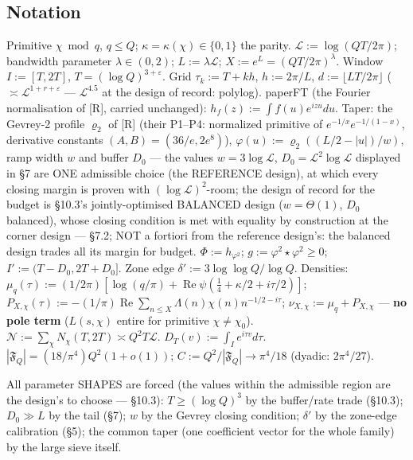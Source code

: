 \documentclass[11pt]{amsart}
\newcommand{\re}{\operatorname{Re}}
\theoremstyle{plain}
\theoremstyle{remark}
\begin{document}
\subsection{Notation}

Primitive $\chi \bmod q$, $q \le Q$; $\kappa = \kappa(\chi) \in \{0, 1\}$ the parity.
$\mathcal{L} := \log(QT/2\pi)$; bandwidth parameter $\lambda \in (0, 2)$;
$L := \lambda\mathcal{L}$; $X := e^L = (QT/2\pi)^\lambda$. Window $I := [T, 2T]$,
$T = (\log Q)^{3+\varepsilon}$. Grid $\tau_k := T + kh$, $h := 2\pi/L$,
$d := \lfloor LT/2\pi\rfloor$ ($\asymp \mathcal{L}^{1+r+\varepsilon}$ ---
$\mathcal{L}^{4.5}$ at the design of record: polylog). paperFT (the Fourier normalisation of [R],
carried unchanged):
$h_f(z) := \int f(u)e^{izu}du$. Taper: the Gevrey-2 profile $\varrho_2$ of [R] (their
P1--P4: normalized primitive of $e^{-1/x}e^{-1/(1-x)}$, derivative constants
$(A, B) = (36/e, 2e^{8})$), $\varphi(u) := \varrho_2((L/2 - |u|)/w)$, ramp width $w$
and buffer $D_0$ --- the values $w = 3 \log \mathcal{L}$,
$D_0 = \mathcal{L}^2 \log \mathcal{L}$ displayed in \S7 are ONE admissible choice (the
REFERENCE design), at which every closing margin is proven with
$(\log \mathcal{L})^2$-room; the design of record for the budget is \S10.3's
jointly-optimised BALANCED design ($w = \Theta(1)$, $D_0$ balanced), whose closing
condition is met with equality by construction at the corner design --- \S7.2; NOT a
fortiori from the reference design's: the balanced design trades all its margin for
budget. $\Phi := h_{\varphi^2}$; $g := \varphi^2\star\varphi^2 \ge 0$;
$I' := (T - D_0, 2T + D_0]$. Zone edge
{\boldmath$\delta' := 3 \log \log Q/\log Q$}. Densities:
$\mu_q(\tau) := (1/2\pi)[\log(q/\pi) + \re \psi(\tfrac{1}{4} + \kappa/2 + i\tau/2)]$;
$P_{X,\chi}(\tau) := -(1/\pi) \re \sum_{n\le X} \Lambda(n)\chi(n)n^{-1/2-i\tau}$;
$\nu_{X,\chi} := \mu_q + P_{X,\chi}$ --- \textbf{no pole term} ($L(s,\chi)$ entire for
primitive $\chi \ne \chi_0$). $\mathcal{N} := \sum_\chi N_\chi(T, 2T) \asymp
Q^2T\mathcal{L}$. $D_T(v) := \int_I e^{i\tau v}d\tau$.
$|\mathfrak{F}_Q| = (18/\pi^4)Q^2(1 + o(1))$; $C := Q^2/|\mathfrak{F}_Q| \to \pi^4/18$
(dyadic: $2\pi^4/27$).

All parameter SHAPES are forced (the values within the admissible region are the
design's to choose --- \S10.3): $T \ge (\log Q)^{3}$ by the buffer/rate trade
(\S10.3); $D_0 \gg L$ by the tail (\S7); $w$ by the Gevrey closing condition;
$\delta'$ by the zone-edge calibration (\S5); the common taper (one coefficient vector
for the whole family) by the large sieve itself.
\end{document}
